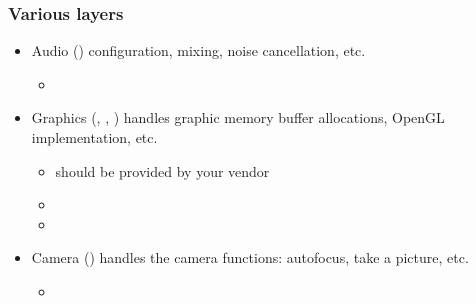 \begin{frame}
  \frametitle{Various layers}
  \begin{itemize}
  \item Audio () configuration, mixing, noise
    cancellation, etc.
    \begin{itemize}
    \item {}
    \end{itemize}
  \item Graphics (, ,
    ) handles graphic memory buffer allocations,
    OpenGL implementation, etc.
    \begin{itemize}
    \item {} should be provided by your vendor
    \item {}
    \item {}
    \end{itemize}
  \item Camera () handles the camera functions:
    autofocus, take a picture, etc.
    \begin{itemize}
    \item {}
    \end{itemize}
  \end{itemize}
\end{frame}

